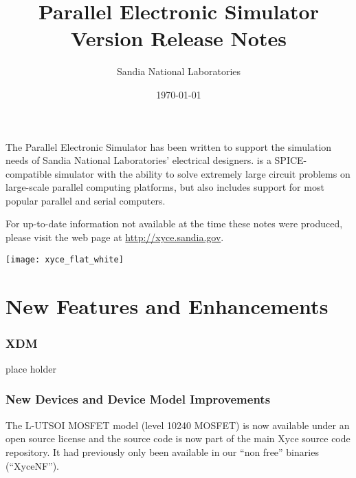 \documentclass[letterpaper]{scrartcl}
\title{\XyceTitle{} Parallel Electronic Simulator\\
Version \XyceVersionVar{} Release Notes}
\author{ Sandia National Laboratories}
\date{\today}
\begin{document}
\maketitle

The \XyceTM{} Parallel Electronic Simulator has been written to support the
simulation needs of Sandia National Laboratories' electrical designers.
\XyceTM{} is a SPICE-compatible simulator with the ability to solve extremely
large circuit problems on large-scale parallel computing platforms, but also
includes support for most popular parallel and serial computers.

For up-to-date information not available at the time these notes were produced,
please visit the \XyceTM{} web page at
{\color{XyceDeepRed}\url{http://xyce.sandia.gov}}.

\tableofcontents
\vspace*{\fill}
\parbox{\textwidth}
{
  \hfill
  \texttt{[image: xyce\_flat\_white]}
}


\newpage
\section{New Features and Enhancements}

\subsubsection*{XDM}
\begin{XyceItemize}
  \item place holder
\end{XyceItemize}

\subsubsection*{New Devices and Device Model Improvements}
\begin{XyceItemize}
  \item The L-UTSOI MOSFET model (level 10240 MOSFET) is now available
    under an open source license and the source code is now part of
    the main Xyce source code repository.  It had previously only been
    available in our ``non free'' binaries (``XyceNF'').
\end{XyceItemize}
\end{document}
